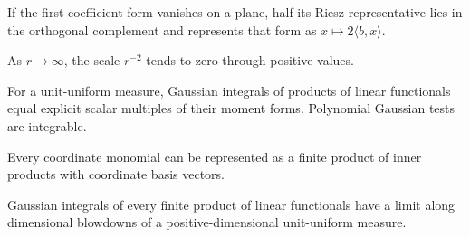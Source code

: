 \begin{lemma}
\label{lem:first-moment-normal-from-vanishing}

If the first coefficient form vanishes on a plane, half its Riesz representative lies in the orthogonal complement and represents that form as $x\mapsto2\langle b,x\rangle$.
\end{lemma}

\begin{lemma}
\label{lem:inverse-square-positive-limit}

As $r\to\infty$, the scale $r^{-2}$ tends to zero through positive values.
\end{lemma}

\begin{lemma}
\label{lem:gaussian-product-moment-conversion}

For a unit-uniform measure, Gaussian integrals of products of linear functionals equal explicit scalar multiples of their moment forms. Polynomial Gaussian tests are integrable.
\end{lemma}

\begin{lemma}
\label{lem:coordinate-product-representation}

Every coordinate monomial can be represented as a finite product of inner products with coordinate basis vectors.
\end{lemma}

\begin{lemma}
\label{lem:blowdown-product-limits}

Gaussian integrals of every finite product of linear functionals have a limit along dimensional blowdowns of a positive-dimensional unit-uniform measure.
\end{lemma}

